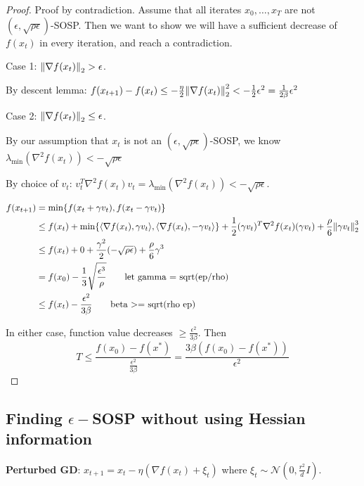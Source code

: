\begin{proof}
    Proof by contradiction. Assume that all iterates \(x_0, \ldots, x_T\) are not \((\epsilon, \sqrt{\rho \epsilon})\)-SOSP. Then we want to show we will have a sufficient decrease of \(f(x_t)\) in every iteration, and reach a contradiction. 

    Case 1: \(\norm{\nabla f(x_t)}_2 > \epsilon\). 

    By descent lemma: \( f(x_{t+1}) - f(x_t) \leq -\frac{\eta}{2} \norm{\nabla f(x_t)}^2_2 < - \frac{1}{2} \epsilon^2 = \frac{1}{2\beta}\epsilon^2\)

    Case 2: \(\norm{\nabla f(x_t)}_2 \leq \epsilon\).

    By our assumption that \(x_t\) is not an \((\epsilon, \sqrt{\rho \epsilon})\)-SOSP, we know \(\lambda_{\text{min}}(\nabla^2 f(x_t)) < - \sqrt{\rho \epsilon}\) 

    By choice of \(v_t\): \(v^T_t \nabla^2 f(x_t) v_t = \lambda_{\text{min}}(\nabla^2 f(x_t)) < - \sqrt{\rho \epsilon}\). 

    \begin{align*}
        f(x_{t+1}) &= \text{min} \{f(x_t + \gamma v_t), f(x_t - \gamma v_t)  \} \\ 
        &\leq f(x_t) + \text{min} \{ \langle \nabla f(x_t), \gamma v_t \rangle, \langle \nabla f(x_t), - \gamma v_t \rangle \} + \frac{1}{2} (\gamma v_t)^T \nabla^2 f(x_t) (\gamma v_t) + \frac{\rho}{6} \norm{\gamma v_t}_2^3 \\ 
        &\leq f(x_t) + 0 + \frac{\gamma^2}{2} (- \sqrt{\rho \epsilon}) + \frac{\rho}{6} \gamma^3 \\ 
        &= f(x_0) - \frac{1}{3} \sqrt{\frac{\epsilon^3}{\rho}} \tag*{let gamma = sqrt(ep/rho)} \\
        &\leq f(x_t) - \frac{\epsilon^2}{3\beta} \tag*{beta >= sqrt(rho ep)} 
    \end{align*}

    In either case, function value decreases \(\geq \frac{\epsilon^2}{3 \beta}\). Then 
    \[
    T \leq \frac{f(x_0) - f(x^*)}{\frac{\epsilon^2}{3\beta}} = \frac{3 \beta (f(x_0) - f(x^*))}{\epsilon^2} 
    \]
\end{proof}

\subsection*{Finding \(\epsilon-\)SOSP without using Hessian information}

\textbf{Perturbed GD}: \(  x_{t+1} = x_t - \eta (\nabla f(x_t) + \xi_t)\)
where \(\xi_t \sim \mathcal{N}(0, \frac{r^2}{d}I)\). 

